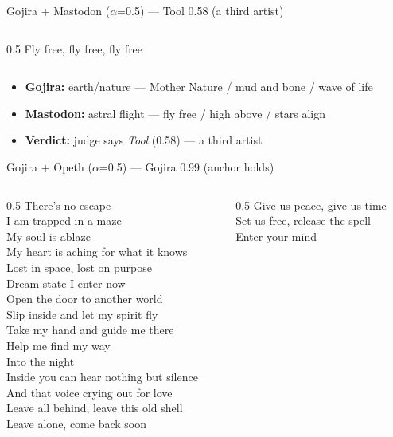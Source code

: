 \documentclass[aspectratio=169]{beamer}
\begin{document}
\begin{frame}{Gojira + Mastodon ($\alpha$=0.5) --- \textcolor{accent}{Tool 0.58 (a third artist)}}
\begin{columns}[T]
\begin{column}{0.5\textwidth}
      Fly free, fly free, fly free
    \end{column}
  \end{columns}
  \upshape\vskip3pt\footnotesize
  \begin{itemize}\setlength{\itemsep}{1pt}
    \item \textbf{Gojira:} earth/nature --- Mother Nature / mud and bone / wave of life
    \item \textbf{Mastodon:} astral flight --- fly free / high above / stars align
    \item \textcolor{accent}{\textbf{Verdict:} judge says \emph{Tool} (0.58) --- a third artist}
  \end{itemize}
\end{frame}

\begin{frame}{Gojira + Opeth ($\alpha$=0.5) --- \textcolor{accent}{Gojira 0.99 (anchor holds)}}
  \scriptsize\itshape\raggedright
  \begin{columns}[T]
    \begin{column}{0.5\textwidth}
      There's no escape\\
      I am trapped in a maze\\
      My soul is ablaze\\
      My heart is aching for what it knows\\
      Lost in space, lost on purpose\\
      Dream state I enter now\\[4pt]
      Open the door to another world\\
      Slip inside and let my spirit fly\\
      Take my hand and guide me there\\
      Help me find my way\\
      Into the night\\
      Inside you can hear nothing but silence\\
      And that voice crying out for love\\[4pt]
      Leave all behind, leave this old shell\\
      Leave alone, come back soon
    \end{column}
    \begin{column}{0.5\textwidth}
      Give us peace, give us time\\
      Set us free, release the spell\\
      Enter your mind\\

\end{column}
\end{columns}
\end{frame}
\end{document}
